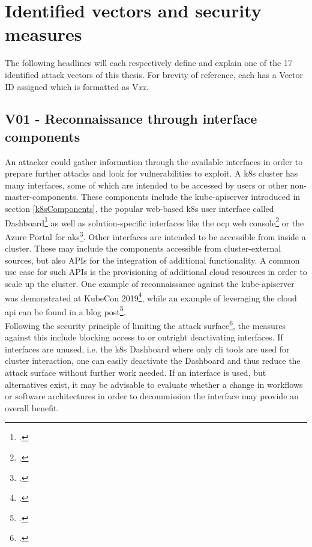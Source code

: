 
\section{Identified vectors and security measures} \label{vectorIdentify}

The following headlines will each respectively define and explain one of the 17 identified attack vectors of this thesis. For brevity of reference, each has a Vector ID assigned which is formatted as V\textit{xx}.

\subsection{V01 - Reconnaissance through interface components} \label{v01}
An attacker could gather information through the available interfaces in order to prepare further attacks and look for vulnerabilities to exploit.
A \gls{k8s} cluster has many interfaces, some of which are intended to be accessed by users or other non-master-components. These components include the kube-apiserver introduced in section \ref{k8sComponents}, the popular web-based \gls{k8s} user interface called Dashboard\footcite[][, first paragraph]{k8sDashboard} as well as solution-specific interfaces like the \gls{ocp} web console\footcite[][, section 'Overview']{ocpWebConsole} or the Azure Portal for \gls{aks}\footcite[][, section 'Create an AKS cluster']{azurePortal}.
Other interfaces are intended to be accessible from inside a cluster. These may include the components accessible from cluster-external sources, but also APIs for the integration of additional functionality. A common use case for such APIs is the provisioning of additional cloud resources in order to scale up the cluster.
One example of reconnaissance against the kube-apiserver was demonstrated at KubeCon 2019\footcite[][, starting at 8:45]{lizReconDemo}, while an example of leveraging the cloud api can be found in a blog post\footcite{aksApiExploit}. \\
Following the security principle of limiting the attack surface\footcite[][, p. 4 to 5]{k8sBook}, the measures against this include blocking access to or outright deactivating interfaces. If interfaces are unused, i.e. the \gls{k8s} Dashboard where only \gls{cli} tools are used for cluster interaction, one can easily deactivate the Dashboard and thus reduce the attack surface without further work needed. If an interface is used, but alternatives exist, it may be advisable to evaluate whether a change in workflows or software architectures in order to decommission the interface may provide an overall benefit.
